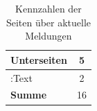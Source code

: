 \begin{table}[htb]
\begin{subtable}[c]{0.5\textwidth}
\begin{tabular}{|l|c|}
                Unterseiten     & 5                                    \\ \hline
                :Text           & 2                                    \\ \hline
                \textbf{Summe}  & 16                                   \\ \hline
                \end{tabular}
            \label{table:findingsNewsFiguresSharedNodes}
        \end{subtable}
        \label{table:findingsNewsFigures}
        \caption{Kennzahlen der Seiten über aktuelle Meldungen}
    \end{table}